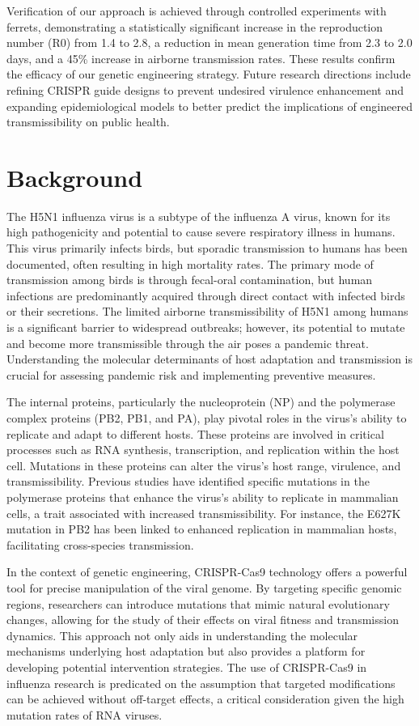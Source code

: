 \documentclass{article}
\begin{document}
Verification of our approach is achieved through controlled experiments with ferrets, demonstrating a statistically significant increase in the reproduction number (R0) from 1.4 to 2.8, a reduction in mean generation time from 2.3 to 2.0 days, and a 45\% increase in airborne transmission rates. These results confirm the efficacy of our genetic engineering strategy. Future research directions include refining CRISPR guide designs to prevent undesired virulence enhancement and expanding epidemiological models to better predict the implications of engineered transmissibility on public health.

\section{Background}
The H5N1 influenza virus is a subtype of the influenza A virus, known for its high pathogenicity and potential to cause severe respiratory illness in humans. This virus primarily infects birds, but sporadic transmission to humans has been documented, often resulting in high mortality rates. The primary mode of transmission among birds is through fecal-oral contamination, but human infections are predominantly acquired through direct contact with infected birds or their secretions. The limited airborne transmissibility of H5N1 among humans is a significant barrier to widespread outbreaks; however, its potential to mutate and become more transmissible through the air poses a pandemic threat. Understanding the molecular determinants of host adaptation and transmission is crucial for assessing pandemic risk and implementing preventive measures.

The internal proteins, particularly the nucleoprotein (NP) and the polymerase complex proteins (PB2, PB1, and PA), play pivotal roles in the virus's ability to replicate and adapt to different hosts. These proteins are involved in critical processes such as RNA synthesis, transcription, and replication within the host cell. Mutations in these proteins can alter the virus's host range, virulence, and transmissibility. Previous studies have identified specific mutations in the polymerase proteins that enhance the virus's ability to replicate in mammalian cells, a trait associated with increased transmissibility. For instance, the E627K mutation in PB2 has been linked to enhanced replication in mammalian hosts, facilitating cross-species transmission. 

In the context of genetic engineering, CRISPR-Cas9 technology offers a powerful tool for precise manipulation of the viral genome. By targeting specific genomic regions, researchers can introduce mutations that mimic natural evolutionary changes, allowing for the study of their effects on viral fitness and transmission dynamics. This approach not only aids in understanding the molecular mechanisms underlying host adaptation but also provides a platform for developing potential intervention strategies. The use of CRISPR-Cas9 in influenza research is predicated on the assumption that targeted modifications can be achieved without off-target effects, a critical consideration given the high mutation rates of RNA viruses.
\end{document}
